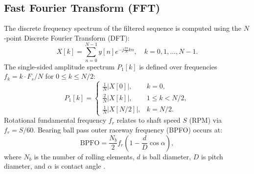 \documentclass[conference,a4paper]{IEEEtran}
\begin{document}
\subsection{Fast Fourier Transform (FFT)}
The discrete frequency spectrum of the filtered sequence is computed using the $N$-point Discrete Fourier Transform (DFT):
\begin{equation}
    X[k] = \sum_{n=0}^{N-1} y[n] e^{-j \frac{2\pi}{N} k n}, \quad k = 0, 1, \ldots, N-1.
    \label{eq:dft}
\end{equation}
The single-sided amplitude spectrum $P_1[k]$ is defined over frequencies $f_k = k \cdot F_s / N$ for $0 \le k \le N/2$:
\begin{equation}
    P_1[k] = 
    \begin{cases}
        \frac{1}{N} |X[0]|, & k = 0, \\
        \frac{2}{N} |X[k]|, & 1 \le k < N/2, \\
        \frac{1}{N} |X[N/2]|, & k = N/2.
    \end{cases}
    \label{eq:p1}
\end{equation}
Rotational fundamental frequency $f_r$ relates to shaft speed $S$ (RPM) via $f_r = S/60$. Bearing ball pass outer raceway frequency (BPFO) occurs at:
\begin{equation}
    \text{BPFO} = \frac{N_b}{2} f_r \left(1 - \frac{d}{D} \cos \alpha \right),
    \label{eq:bpfo}
\end{equation}
where $N_b$ is the number of rolling elements, $d$ is ball diameter, $D$ is pitch diameter, and $\alpha$ is contact angle \cite{randall2011}.
\end{document}
